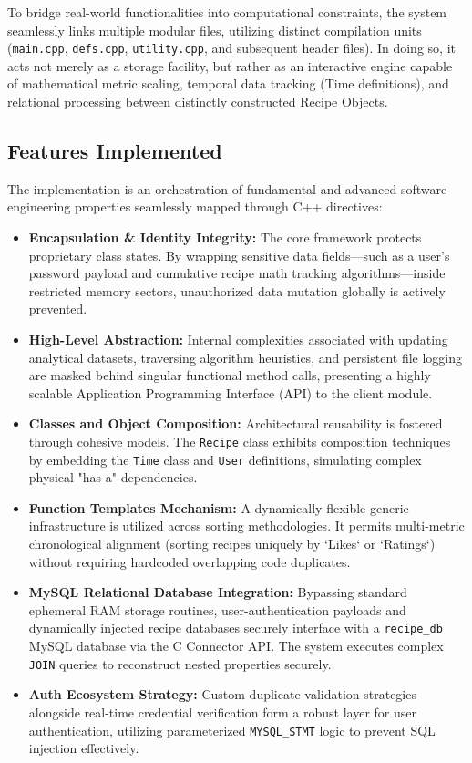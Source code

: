 \documentclass[12pt, a4paper]{article}
\begin{document}
To bridge real-world functionalities into computational constraints, the system seamlessly links multiple modular files, utilizing distinct compilation units (\texttt{main.cpp}, \texttt{defs.cpp}, \texttt{utility.cpp}, and subsequent header files). In doing so, it acts not merely as a storage facility, but rather as an interactive engine capable of mathematical metric scaling, temporal data tracking (Time definitions), and relational processing between distinctly constructed Recipe Objects.

\subsection{Features Implemented}
The implementation is an orchestration of fundamental and advanced software engineering properties seamlessly mapped through C++ directives:

\begin{itemize}
    \item \textbf{Encapsulation \& Identity Integrity:} The core framework protects proprietary class states. By wrapping sensitive data fields—such as a user's password payload and cumulative recipe math tracking algorithms—inside restricted memory sectors, unauthorized data mutation globally is actively prevented.
    \item \textbf{High-Level Abstraction:} Internal complexities associated with updating analytical datasets, traversing algorithm heuristics, and persistent file logging are masked behind singular functional method calls, presenting a highly scalable Application Programming Interface (API) to the client module.
    \item \textbf{Classes and Object Composition:} Architectural reusability is fostered through cohesive models. The \texttt{Recipe} class exhibits composition techniques by embedding the \texttt{Time} class and \texttt{User} definitions, simulating complex physical "has-a" dependencies.
    \item \textbf{Function Templates Mechanism:} A dynamically flexible generic infrastructure is utilized across sorting methodologies. It permits multi-metric chronological alignment (sorting recipes uniquely by `Likes` or `Ratings`) without requiring hardcoded overlapping code duplicates.
    \item \textbf{MySQL Relational Database Integration:} Bypassing standard ephemeral RAM storage routines, user-authentication payloads and dynamically injected recipe databases securely interface with a \texttt{recipe\_db} MySQL database via the C Connector API. The system executes complex \texttt{JOIN} queries to reconstruct nested properties securely.
    \item \textbf{Auth Ecosystem Strategy:} Custom duplicate validation strategies alongside real-time credential verification form a robust layer for user authentication, utilizing parameterized \texttt{MYSQL\_STMT} logic to prevent SQL injection effectively.
\end{itemize}
\end{document}
